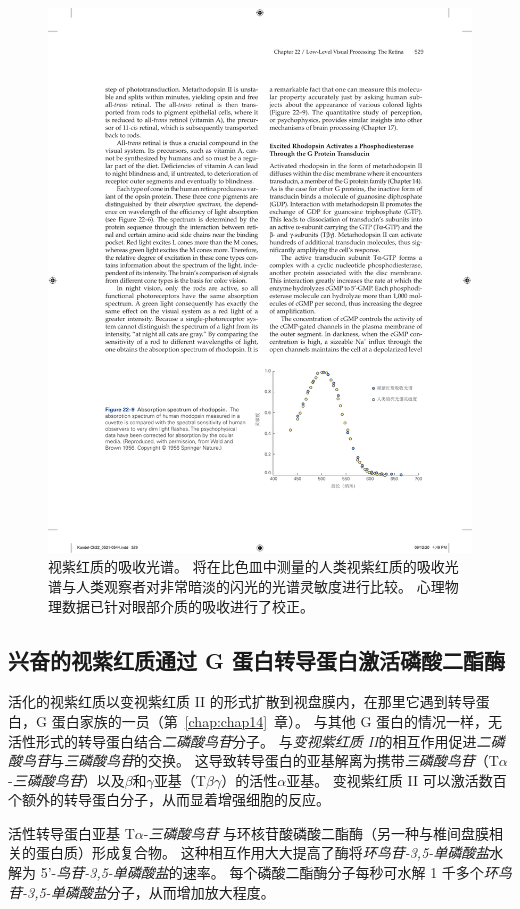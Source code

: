 \begin{figure}[htbp]
	\centering
	\includegraphics[width=0.8\linewidth]{chap22/fig_22_9}
	\caption{视紫红质的吸收光谱。 
		将在比色皿中测量的人类视紫红质的吸收光谱与人类观察者对非常暗淡的闪光的光谱灵敏度进行比较。
		心理物理数据已针对眼部介质的吸收进行了校正。}
	\label{fig:22_9}
\end{figure}



\subsection{兴奋的视紫红质通过 G 蛋白转导蛋白激活磷酸二酯酶}

活化的视紫红质以变视紫红质 II 的形式扩散到视盘膜内，在那里它遇到转导蛋白，G 蛋白家族的一员（第~\ref{chap:chap14}~章）。
与其他 G 蛋白的情况一样，无活性形式的转导蛋白结合\textit{二磷酸鸟苷}分子。
与\textit{变视紫红质 II}的相互作用促进\textit{二磷酸鸟苷}与\textit{三磷酸鸟苷}的交换。
这导致转导蛋白的亚基解离为携带\textit{三磷酸鸟苷}（T$\alpha$-\textit{三磷酸鸟苷}）以及$\beta$和$\gamma$亚基（T$\beta$$\gamma$）的活性$\alpha$亚基。
变视紫红质 II 可以激活数百个额外的转导蛋白分子，从而显着增强细胞的反应。


活性转导蛋白亚基 T$\alpha$-\textit{三磷酸鸟苷} 与环核苷酸磷酸二酯酶（另一种与椎间盘膜相关的蛋白质）形成复合物。
这种相互作用大大提高了酶将\textit{环鸟苷-3,5-单磷酸盐}水解为 5'-\textit{鸟苷-3,5-单磷酸盐}的速率。
每个磷酸二酯酶分子每秒可水解 1 千多个\textit{环鸟苷-3,5-单磷酸盐}分子，从而增加放大程度。


